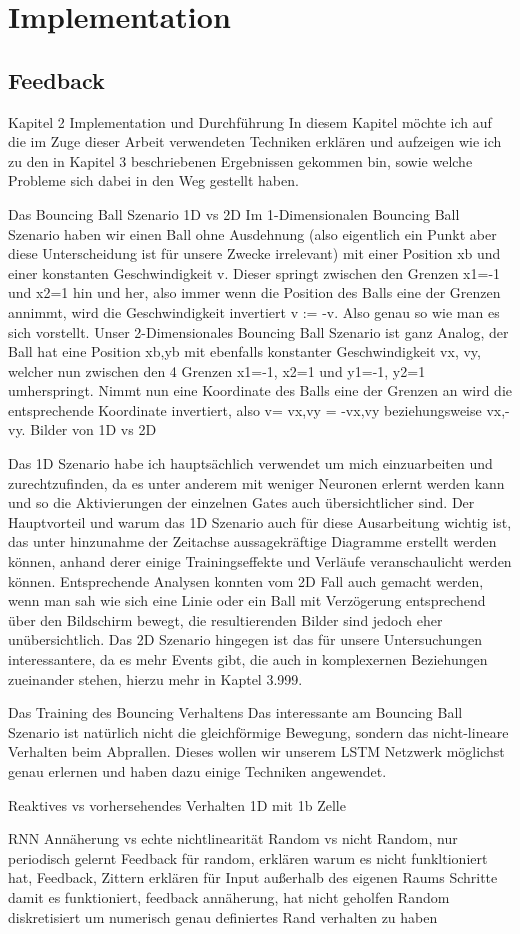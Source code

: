 \chapter{Implementation}
\label{ch:nc_analysis}
\section{Feedback}
Kapitel 2 Implementation und Durchführung
In diesem Kapitel möchte ich auf die im Zuge dieser Arbeit verwendeten Techniken erklären und aufzeigen wie ich zu den in Kapitel 3 beschriebenen Ergebnissen gekommen bin, sowie welche Probleme sich dabei in den Weg gestellt haben.

Das Bouncing Ball Szenario
1D vs 2D
Im 1-Dimensionalen Bouncing Ball Szenario haben wir einen Ball ohne Ausdehnung (also eigentlich ein Punkt aber diese Unterscheidung ist für unsere Zwecke irrelevant) mit einer Position xb und einer konstanten Geschwindigkeit v. Dieser springt zwischen den Grenzen x1=-1 und x2=1 hin und her, also immer wenn die Position des Balls eine der Grenzen annimmt, wird die Geschwindigkeit invertiert v := -v. Also genau so wie man es sich vorstellt.
Unser 2-Dimensionales Bouncing Ball Szenario ist ganz Analog, der Ball hat eine Position xb,yb mit ebenfalls konstanter Geschwindigkeit vx, vy, welcher nun zwischen den 4 Grenzen x1=-1, x2=1 und y1=-1, y2=1 umherspringt. Nimmt nun eine Koordinate des Balls eine der Grenzen an wird die entsprechende Koordinate invertiert, also  v= vx,vy = -vx,vy beziehungsweise vx,-vy. 
Bilder von 1D vs 2D

Das 1D Szenario habe ich hauptsächlich verwendet um mich einzuarbeiten und zurechtzufinden, da es unter anderem mit weniger Neuronen erlernt werden kann und so die Aktivierungen der einzelnen Gates auch übersichtlicher sind. Der Hauptvorteil und warum das 1D Szenario auch für diese Ausarbeitung wichtig ist, das unter hinzunahme der Zeitachse aussagekräftige Diagramme erstellt werden können, anhand derer einige Trainingseffekte und Verläufe veranschaulicht werden können. Entsprechende Analysen konnten vom 2D Fall auch gemacht werden, wenn man sah wie sich eine Linie  oder ein Ball mit Verzögerung entsprechend über den Bildschirm bewegt, die resultierenden Bilder sind jedoch eher unübersichtlich. Das 2D Szenario hingegen ist das für unsere Untersuchungen interessantere, da es mehr Events gibt, die auch in komplexernen Beziehungen zueinander stehen, hierzu mehr in Kaptel 3.999.

Das Training des Bouncing Verhaltens
Das interessante am Bouncing Ball Szenario ist natürlich nicht die gleichförmige Bewegung, sondern das nicht-lineare Verhalten beim Abprallen. Dieses wollen wir unserem LSTM Netzwerk möglichst genau erlernen und haben dazu einige Techniken angewendet. 

Reaktives vs vorhersehendes Verhalten
1D mit 1b Zelle

RNN Annäherung vs echte nichtlinearität
Random vs nicht Random, nur periodisch gelernt
Feedback für random, erklären warum es nicht funkltioniert hat,
Feedback, Zittern erklären für Input außerhalb des eigenen Raums
Schritte damit es funktioniert, feedback annäherung, hat nicht geholfen
Random diskretisiert um numerisch genau definiertes Rand verhalten zu haben